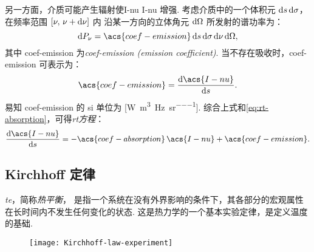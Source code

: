另一方面，介质可能产生辐射使\acl{I-nu} \acs{I-nu} 增强.
考虑介质中的一个体积元 $\mathrm{d}s\,\mathrm{d}\sigma$，在频率范围 $[\nu, \,\nu+\mathrm{d}\nu]$ 内
沿某一方向的立体角元 $\mathrm{d}\Omega$ 所发射的谱功率为：
\begin{equation}
  \D{P_{\nu}} =
    \acs{coef-emission} \,\D{s}\,\D{\sigma}\,\D{\nu}\,\D{\Omega} ,
\end{equation}
其中 \acs{coef-emission} 为\emph{\acl{coef-emission} (emission coefficient)}.
当不存在吸收时，\acs{coef-emission} 可表示为：
\begin{equation}
  \label{eq:coef-emission}
  \acs{coef-emission} = \diff{\acs{I-nu}}{s} .
\end{equation}
易知 \acs{coef-emission} 的 \ac{si} 单位为
[\si{\watt\per\cubic\meter\per\hertz\per\steradian}].
综合上式和\autoref{eq:rt-absorption}，可得\emph{\ac{rt}方程}：
\begin{equation}
  \label{eq:radiative-transfer}
  \diff{\acs{I-nu}}{s} =
    - \acs{coef-absorption} \,\acs{I-nu} + \acs{coef-emission} .
\end{equation}

\subsection{Kirchhoff 定律}

\emph{\acf{te}}，简称\emph{热平衡}，
是指一个系统在没有外界影响的条件下，其各部分的宏观属性在长时间内不发生任何变化的状态.
这是热力学的一个基本实验定律，是定义温度的基础.

\begin{figure}[htp]
  \centering
  \texttt{[image: Kirchhoff-law-experiment]}
  \label{fig:kirchhoff-experiment}
\end{figure}


